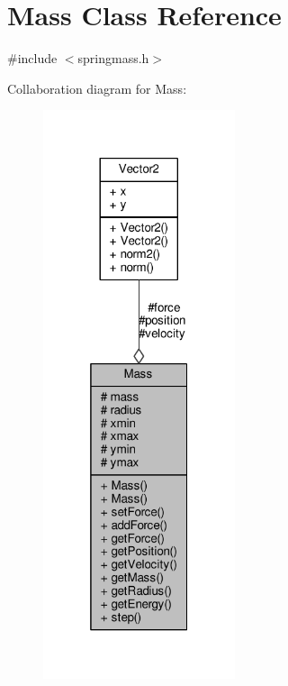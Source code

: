 \hypertarget{classMass}{}\section{Mass Class Reference}
\label{classMass}


{\ttfamily \#include $<$springmass.\+h$>$}



Collaboration diagram for Mass\+:
\nopagebreak
\begin{figure}[H]
\begin{center}
\leavevmode
\includegraphics[width=160pt]{classMass__coll__graph}
\end{center}
\end{figure}
